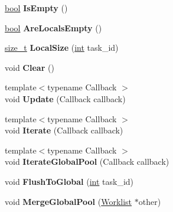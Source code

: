 \begin{DoxyCompactItemize}
\mbox{\hyperlink{classbool}{bool}} {\bfseries Is\+Empty} ()
\item 
\mbox{\label{classv8_1_1internal_1_1Worklist_ae05cc316f4fb4b9868aff70f16693a22}} 
\mbox{\hyperlink{classbool}{bool}} {\bfseries Are\+Locals\+Empty} ()
\item 
\mbox{\label{classv8_1_1internal_1_1Worklist_a16f74bb12cd27c34cfaf9e7ed02cdab4}} 
\mbox{\hyperlink{classsize__t}{size\+\_\+t}} {\bfseries Local\+Size} (\mbox{\hyperlink{classint}{int}} task\+\_\+id)
\item 
\mbox{\label{classv8_1_1internal_1_1Worklist_ad681112e72a127b010cb48917ac88a30}} 
void {\bfseries Clear} ()
\item 
\mbox{\label{classv8_1_1internal_1_1Worklist_a39e7c67b8ff572d4a4b50dae9bd4c5d8}} 
{\footnotesize template$<$typename Callback $>$ }\\void {\bfseries Update} (Callback callback)
\item 
\mbox{\label{classv8_1_1internal_1_1Worklist_a94ec2eb41f27643dc190850edfc6d2d6}} 
{\footnotesize template$<$typename Callback $>$ }\\void {\bfseries Iterate} (Callback callback)
\item 
\mbox{\label{classv8_1_1internal_1_1Worklist_a3cf4b528e51c809e79f3da3e50d960ec}} 
{\footnotesize template$<$typename Callback $>$ }\\void {\bfseries Iterate\+Global\+Pool} (Callback callback)
\item 
\mbox{\label{classv8_1_1internal_1_1Worklist_ab0b57617237dd517e04bbc5fe000ccfa}} 
void {\bfseries Flush\+To\+Global} (\mbox{\hyperlink{classint}{int}} task\+\_\+id)
\item 
\mbox{\label{classv8_1_1internal_1_1Worklist_aaa99d1ef92e24761e5fbef01742120bc}} 
void {\bfseries Merge\+Global\+Pool} (\mbox{\hyperlink{classv8_1_1internal_1_1Worklist}{Worklist}} $\ast$other)
\end{DoxyCompactItemize}
